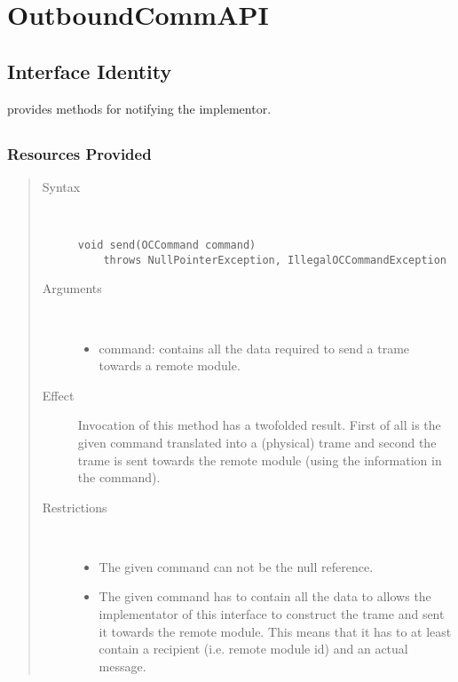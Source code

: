 \section{OutboundCommAPI}
\label{api:rm-outbound-comm-api}

\subsection{Interface Identity}

\npar {} provides methods for notifying the
implementor.

\subsection{}

\subsubsection{Resources Provided}

\begin{quote}
	\begin{description}
		\item[Syntax] \
		\begin{verbatim}
void send(OCCommand command)
    throws NullPointerException, IllegalOCCommandException
		\end{verbatim}
		\item[Arguments] \
		\begin{itemize}
		  \item command: contains all the data required to send a trame towards a
		  remote module.
		\end{itemize}
		\item[Effect] Invocation of this method has a twofolded result. First of
		all is the given command translated into a (physical) trame and second the
		trame is sent towards the remote module (using the information in the
		command).
		\item[Restrictions] \
		\begin{itemize}
		  \item The given command can not be the null reference.
		  \item The given command has to contain all the data to allows the
		  implementator of this interface to construct the trame and sent it towards
		  the remote module. This means that it has to at least contain a recipient
		  (i.e. remote module id) and an actual message.
		\end{itemize}
	\end{description} 
\end{quote}

